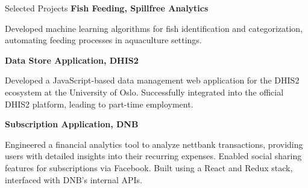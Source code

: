 \begin{rubric}{Selected Projects}
%
\entry*[2018]%
\textbf{Fish Feeding, Spillfree Analytics} \par
\begin{compactitem}
\item Developed machine learning algorithms for fish identification and categorization, automating feeding processes in aquaculture settings.
\vspace{-12pt}
\end{compactitem}
%
\entry*[2017]%
\textbf{Data Store Application, DHIS2} \par
\begin{compactitem}
\item Developed a JavaScript-based data management web application for the DHIS2 ecosystem at the University of Oslo. Successfully integrated into the official DHIS2 platform, leading to part-time employment.
\vspace{-12pt}
\end{compactitem}
%
\entry*[2017]%
\textbf{Subscription Application, DNB} \par
\begin{compactitem}
\item Engineered a financial analytics tool to analyze nettbank transactions, providing users with detailed insights into their recurring expenses. Enabled social sharing features for subscriptions via Facebook. Built using a React and Redux stack, interfaced with DNB's internal APIs.
\vspace{-12pt}
\end{compactitem}
%
\end{rubric}